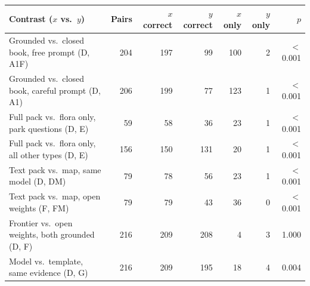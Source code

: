 \begin{tabular}{p{6.4cm}rrrrrr}
\toprule
Contrast ($x$ vs.\ $y$) & Pairs & $x$ correct & $y$ correct & $x$ only & $y$ only & $p$ \\
\midrule
Grounded vs.\ closed book, free prompt (D, A1F) & 204 & 197 & 99 & 100 & 2 & $<$0.001 \\
Grounded vs.\ closed book, careful prompt (D, A1) & 206 & 199 & 77 & 123 & 1 & $<$0.001 \\
Full pack vs.\ flora only, park questions (D, E) & 59 & 58 & 36 & 23 & 1 & $<$0.001 \\
Full pack vs.\ flora only, all other types (D, E) & 156 & 150 & 131 & 20 & 1 & $<$0.001 \\
Text pack vs.\ map, same model (D, DM) & 79 & 78 & 56 & 23 & 1 & $<$0.001 \\
Text pack vs.\ map, open weights (F, FM) & 79 & 79 & 43 & 36 & 0 & $<$0.001 \\
Frontier vs.\ open weights, both grounded (D, F) & 216 & 209 & 208 & 4 & 3 & 1.000 \\
Model vs.\ template, same evidence (D, G) & 216 & 209 & 195 & 18 & 4 & 0.004 \\
\bottomrule
\end{tabular}
